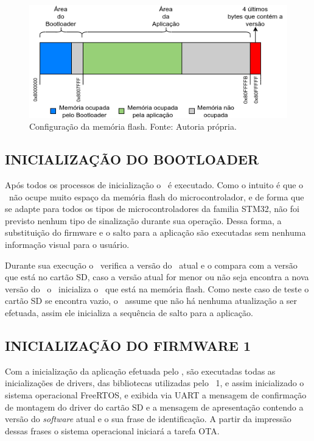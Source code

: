 \begin{figure}[H]
    \scriptsize
     \centering
     \includegraphics[scale=0.9]{dados/figuras/flash_ocupation.png}
     \caption{Configuração da memória flash. \newline Fonte: Autoria própria.}
     \label{memoriaflash}
\end{figure}

\subsection{INICIALIZAÇÃO DO BOOTLOADER}
Após todos os processos de inicialização o \bootloader\ é executado. Como o intuito é que o \bootloader\ não ocupe muito espaço da memória flash do microcontrolador, e de forma que se adapte para todos os tipos de microcontroladores da familia STM32, não foi previsto nenhum tipo de sinalização durante sua operação. Dessa forma, a substituição do firmware e o salto para a aplicação são executadas sem nenhuma informação visual para o usuário.

Durante sua execução o \bootloader\ verifica a versão do \firmware\ atual e o compara com a versão que está no cartão SD, caso a versão atual for menor ou não seja encontra a nova versão do \firmware\, o \bootloader\ inicializa o \firmware\ que está na memória flash. Como neste caso de teste o cartão SD se encontra vazio, o \bootloader\ assume que não há nenhuma atualização a ser efetuada, assim ele inicializa a sequência de salto para a aplicação. 

\subsection{INICIALIZAÇÃO DO FIRMWARE 1}
Com a inicialização da aplicação efetuada pelo \bootloader, são executadas todas as inicializações de drivers, das bibliotecas utilizadas pelo \firmware\ 1, e assim inicializado o sistema operacional FreeRTOS, e exibida via UART a mensagem de confirmação de montagem do driver do cartão SD e a mensagem de apresentação contendo a versão do \textit{software} atual e o sua frase de identificação. A partir da impressão dessas frases o sistema operacional iniciará a tarefa OTA.

